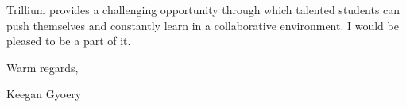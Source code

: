 \documentclass[a4paper,11pt]{article}
\begin{document}
Trillium provides a challenging opportunity through which talented students can push themselves
and constantly learn in a collaborative environment. I would be pleased to be a part of it. \par

Warm regards, \par

Keegan Gyoery
\end{document}
